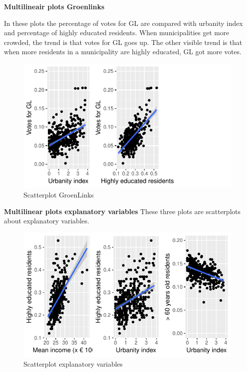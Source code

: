 \documentclass[11pt,]{article}
\begin{document}
\textbf{Multilineair plots Groenlinks}

In these plots the percentage of votes for GL are compared with urbanity
index and percentage of highly educated residents. When municipalities
get more crowded, the trend is that votes for GL goes up. The other
visible trend is that when more residents in a municipality are highly
educated, GL got more votes.\\

\begin{figure}[H]

{\centering \includegraphics{Report_files/figure-latex/unnamed-chunk-6-1} 

}

\caption{Scatterplot GroenLinks}\label{fig:unnamed-chunk-6}
\end{figure}

\textbf{Multilinear plots explanatory variables} These three plots are
scatterplots about explanatory variables.

\begin{figure}[H]

{\centering \includegraphics{Report_files/figure-latex/unnamed-chunk-7-1} 

}

\caption{Scatterplot explanatory variables}\label{fig:unnamed-chunk-7}
\end{figure}
\end{document}

